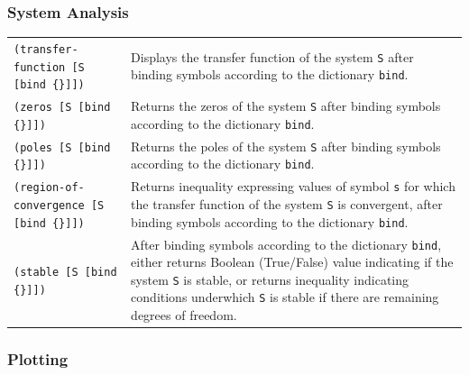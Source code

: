 \documentclass[11pt,letter]{article}
\begin{document}
\subsubsection{System Analysis}

\begin{longtable}{ p{} p{} }
  \texttt{(transfer-function [S [bind \{\}]])}
  &
  Displays the transfer function of the system \texttt{S} after binding symbols according to the dictionary \texttt{bind}. \\

  \texttt{(zeros [S [bind \{\}]])}
  &
  Returns the zeros of the system \texttt{S} after binding symbols according to the dictionary \texttt{bind}. \\

  \texttt{(poles [S [bind \{\}]])}
  &
  Returns the poles of the system \texttt{S} after binding symbols according to the dictionary \texttt{bind}. \\

  \texttt{(region-of-convergence [S [bind \{\}]])}
  &
  Returns inequality expressing values of symbol \texttt{s} for which the transfer function of the system \texttt{S} is convergent, after binding symbols according to the dictionary \texttt{bind}. \\

  \texttt{(stable [S [bind \{\}]])}
  &
  After binding symbols according to the dictionary \texttt{bind}, either returns Boolean (True/False) value indicating if the system \texttt{S} is stable, or returns inequality indicating conditions underwhich \texttt{S} is stable if there are remaining degrees of freedom.
\end{longtable}

\subsubsection{Plotting}
\end{document}

